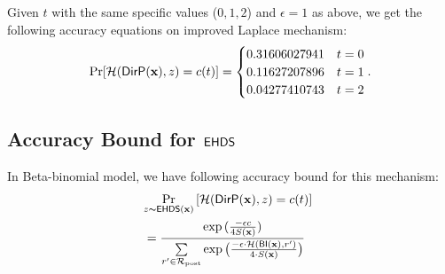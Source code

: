 \documentclass{article}
\begin{document}
Given $t$ with the same specific values ($0,1,2$) and $\epsilon = 1$ as above, we get the following accuracy equations on improved Laplace mechanism:
\[
\Pr[
\mathcal{H}(\mathsf{DirP}(\textbf{x}), z ) = c(t)
]
 =  \begin{cases}
0.31606027941 & t = 0\\
0.11627207896 & t = 1\\
0.04277410743 & t = 2
\end{cases}.
\]

\subsection{Accuracy Bound for $\mathsf{EHDS}$}
\label{subsec_accuracy_smoo}
\begin{lem}
\label{lem_acc_hexp}
  In Beta-binomial model,
  we have following accuracy bound for this mechanism:
%
  \begin{align*}
  \lefteqn{ \hexpmechPr{\dataobs}{\hellinger(\bysinfer{\dataobs}, z) = c(t)  } }\\ 
  &  = \frac{\exp{(\frac{- \epsilon c}{4 S(\dataobs)})}}{\nomalizer{\dataobs}}
  \end{align*}
\end{lem}
\end{document}
